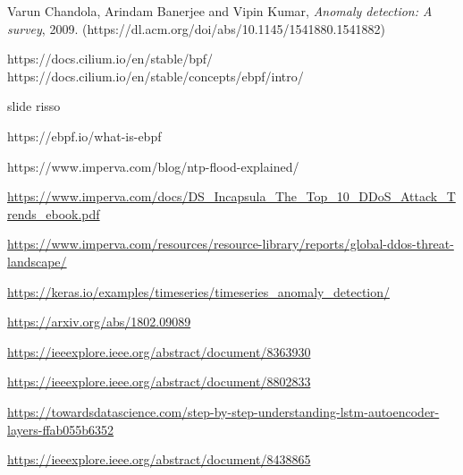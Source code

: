 \begin{thebibliography}{9}
     Varun Chandola, Arindam Banerjee and Vipin Kumar, {\em Anomaly detection: A survey}, 2009. (https://dl.acm.org/doi/abs/10.1145/1541880.1541882)
    
     https://docs.cilium.io/en/stable/bpf/
     https://docs.cilium.io/en/stable/concepts/ebpf/intro/

     slide risso
     
     https://ebpf.io/what-is-ebpf

     https://www.imperva.com/blog/ntp-flood-explained/

     \url{https://www.imperva.com/docs/DS_Incapsula_The_Top_10_DDoS_Attack_Trends_ebook.pdf}
    
     \url{https://www.imperva.com/resources/resource-library/reports/global-ddos-threat-landscape/}

     \url{https://keras.io/examples/timeseries/timeseries_anomaly_detection/}

     \url{https://arxiv.org/abs/1802.09089}

     \url{https://ieeexplore.ieee.org/abstract/document/8363930}

     \url{https://ieeexplore.ieee.org/abstract/document/8802833}

     \url{https://towardsdatascience.com/step-by-step-understanding-lstm-autoencoder-layers-ffab055b6352}

     \url{https://ieeexplore.ieee.org/abstract/document/8438865}







\end{thebibliography}

